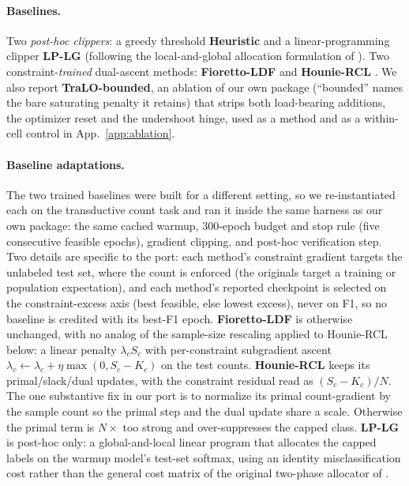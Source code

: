 \documentclass[10pt]{article}
\begin{document}
\paragraph{Baselines.}
Two \emph{post-hoc clippers}: a greedy threshold \textbf{Heuristic} and a
linear-programming clipper \textbf{LP-LG} (following the local-and-global
allocation formulation of \citealt{shifman2025classification}). Two
constraint-\emph{trained} dual-ascent
methods: \textbf{Fioretto-LDF} \citep{fioretto2020lagrangian} and
\textbf{Hounie-RCL} \citep{hounie2023resilient}. We also report
\textbf{TraLO-bounded}, an ablation of our own package (``bounded'' names
the bare saturating penalty it retains) that strips both load-bearing
additions, the optimizer reset and the undershoot hinge, used as a method
and as a within-cell control in App.~\ref{app:ablation}.

\paragraph{Baseline adaptations.}
The two trained baselines were built for a different setting, so we
re-instantiated each on the transductive count task and ran it inside the
same harness as our own package: the same cached warmup, $300$-epoch budget
and stop rule (five consecutive feasible epochs), gradient clipping, and
post-hoc verification step. Two details are specific to the port: each
method's constraint gradient targets the unlabeled test set, where the
count is enforced (the originals target a training or population
expectation), and each method's reported checkpoint is selected on the
constraint-excess axis (best feasible, else lowest excess), never on F1, so
no baseline is credited with its best-F1 epoch. \textbf{Fioretto-LDF} is
otherwise unchanged, with no analog of the sample-size rescaling applied to
Hounie-RCL below: a linear penalty $\lambda_c S_c$ with per-constraint
subgradient ascent
$\lambda_c\!\leftarrow\!\lambda_c+\eta\max(0,S_c\!-\!K_c)$ on the test
counts. \textbf{Hounie-RCL} keeps its primal/slack/dual updates, with the
constraint residual read as $(S_c\!-\!K_c)/N$. The one substantive fix in
our port is to normalize its primal count-gradient by the sample count so
the primal step and the dual update share a scale. Otherwise the primal
term is $N\times$ too strong and over-suppresses the capped class.
\textbf{LP-LG} is post-hoc only: a global-and-local linear program that
allocates the capped labels on the warmup model's test-set softmax, using
an identity misclassification cost rather than the general cost matrix
of the original two-phase allocator of
\citet{shifman2025classification}.
\end{document}
